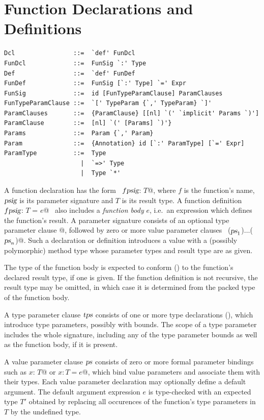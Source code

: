 \section{Function Declarations and Definitions}
\label{sec:funsigs}

\syntax\begin{lstlisting} 
Dcl                ::=  `def' FunDcl
FunDcl             ::=  FunSig `:' Type
Def                ::=  `def' FunDef
FunDef             ::=  FunSig [`:' Type] `=' Expr 
FunSig             ::=  id [FunTypeParamClause] ParamClauses
FunTypeParamClause ::=  `[' TypeParam {`,' TypeParam} `]' 
ParamClauses       ::=  {ParamClause} [[nl] `(' `implicit' Params `)']
ParamClause        ::=  [nl] `(' [Params] `)'} 
Params             ::=  Param {`,' Param}
Param              ::=  {Annotation} id [`:' ParamType] [`=' Expr]
ParamType          ::=  Type 
                     |  `=>' Type 
                     |  Type `*'
\end{lstlisting}

A function declaration has the form ~\lstinline@def $f \mbox{\sl psig}$: $T$@, where
$f$ is the function's name, $\mbox{\sl psig}$ is its parameter
signature and $T$ is its result type. A function definition
~\lstinline@def $f \mbox{\sl psig}$: $T$ = $e$@~ also includes a {\em function body} $e$,
i.e.\ an expression which defines the function's result.  A parameter
signature consists of an optional type parameter clause \lstinline@[$\tps\,$]@,
followed by zero or more value parameter clauses
~\lstinline@($\mbox{\sl ps}_1$)$\ldots$($\mbox{\sl ps}_n$)@.  Such a declaration or definition
introduces a value with a (possibly polymorphic) method type whose
parameter types and result type are as given.

The type of the function body is expected to conform () 
to the function's declared
result type, if one is given. If the function definition is not
recursive, the result type may be omitted, in which case it is
determined from the packed type of the function body.

A type parameter clause $\mbox{\sl tps}$ consists of one or more type
declarations (), which introduce type parameters,
possibly with bounds.  The scope of a type parameter includes
the whole signature, including any of the type parameter bounds as
well as the function body, if it is present.  

A value parameter clause $\mbox{\sl ps}$ consists of zero or more formal
parameter bindings such as \lstinline@$x$: $T$@ or \lstinline@$x: T = e$@, which bind value
parameters and associate them with their types. Each value parameter
declaration may optionally define a default argument. The default argument
expression $e$ is type-checked with an expected type $T'$ obtained
by replacing all occurences of the function's type parameters in $T$ by
the undefined type.


